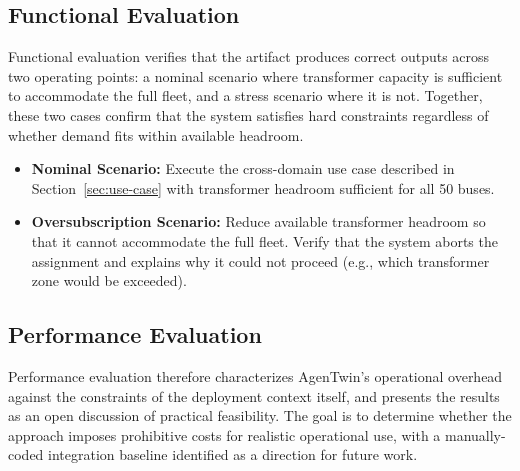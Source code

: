\subsection{Functional Evaluation}
\label{subsec:functional-evaluation}

Functional evaluation verifies that the artifact produces correct outputs
    across two operating points: a nominal scenario where transformer capacity is sufficient
    to accommodate the full fleet, and a stress scenario where it is not.
Together, these two cases confirm that the system satisfies hard constraints
    regardless of whether demand fits within available headroom.

\begin{itemize}
    \item \textbf{Nominal Scenario:} %
    Execute the cross-domain use case described in Section~\ref{sec:use-case}
        with transformer headroom sufficient for all 50 buses.

    \item \textbf{Oversubscription Scenario:} %
    Reduce available transformer headroom so that it cannot accommodate the full fleet.
    Verify that the system aborts the assignment and explains why it could not proceed
        (e.g., which transformer zone would be exceeded).
\end{itemize}

\subsection{Performance Evaluation}
\label{subsec:performance-evaluation}

Performance evaluation therefore characterizes AgenTwin's operational overhead
    against the constraints of the deployment context itself,
    and presents the results as an open discussion of practical feasibility.
The goal is to determine whether the approach imposes prohibitive costs
    for realistic operational use,
    with a manually-coded integration baseline identified as a direction for future work.

